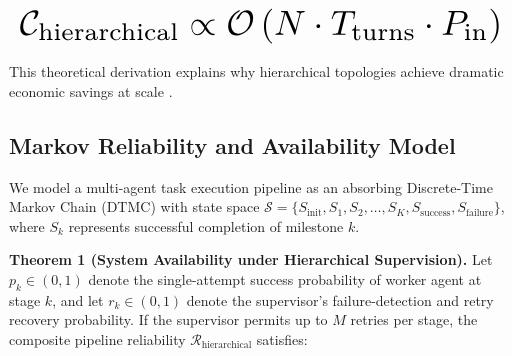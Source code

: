 \documentclass{article}
\begin{document}
\begin{equation}
\resizebox{\columnwidth}{!}{$\displaystyle
\begin{aligned}
\mathcal{C}_{\text{hierarchical}} \propto \mathcal{O}\left(N \cdot T_{\text{turns}} \cdot P_{\text{in}}\right)
\end{aligned}
$}
\end{equation}


























This theoretical derivation explains why hierarchical topologies achieve dramatic economic savings at scale \cite{arxiv_2501_02497}.




\subsection{Markov Reliability and Availability Model}


We model a multi-agent task execution pipeline as an absorbing Discrete-Time Markov Chain (DTMC) with state space $\mathcal{S} = \{S_{\text{init}}, S_1, S_2, \ldots, S_K, S_{\text{success}}, S_{\text{failure}}\}$, where $S_k$ represents successful completion of milestone $k$.

\textbf{Theorem 1 (System Availability under Hierarchical Supervision).} Let $p_k \in (0, 1)$ denote the single-attempt success probability of worker agent at stage $k$, and let $r_k \in (0, 1)$ denote the supervisor's failure-detection and retry recovery probability. If the supervisor permits up to $M$ retries per stage, the composite pipeline reliability $\mathcal{R}_{\text{hierarchical}}$ satisfies:
\end{document}
